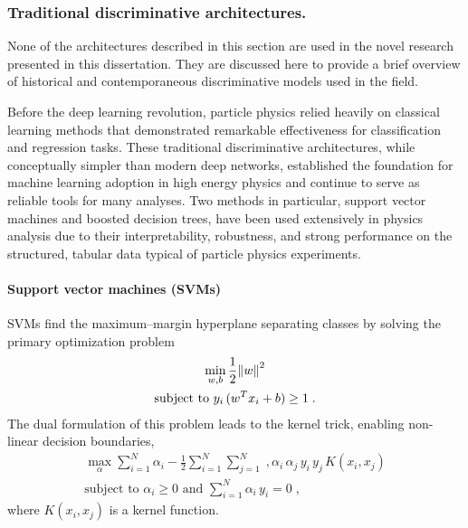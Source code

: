         \subsubsection{Traditional discriminative architectures.}
                \begin{note*}
                    None of the architectures described in this section are used in the novel research presented in this dissertation.
                    They are discussed here to provide a brief overview of historical and contemporaneous discriminative models used in the field.
                \end{note*}
            Before the deep learning revolution, particle physics relied heavily on classical learning methods that demonstrated remarkable effectiveness for classification and regression tasks.
            These traditional discriminative architectures, while conceptually simpler than modern deep networks, established the foundation for machine learning adoption in high energy physics and continue to serve as reliable tools for many analyses.
            Two methods in particular, support vector machines and boosted decision trees, have been used extensively in physics analysis due to their interpretability, robustness, and strong performance on the structured, tabular data typical of particle physics experiments.
        \paragraph{Support vector machines (SVMs)}
            SVMs find the maximum--margin hyperplane separating classes by solving the primary optimization problem
            \begin{gather}
                \min_{w,b} \frac{1}{2}\norm{w}^2 \\ \text{subject to } y_i\,(w^T x_i + b) \geq 1\;.
            \end{gather}
            The dual formulation of this problem leads to the kernel trick, enabling non-linear decision boundaries,
            \begin{gather}
                \max_{\alpha} \sum_{i=1}^N \alpha_i - \frac{1}{2}\sum_{i=1}^N\sum_{j=1}^N \;,\alpha_i\,\alpha_j \,y_i\, y_j \,K(x_i,x_j)\\\text{subject to }\alpha_i\ge0 \text{ and } \sum_{i=1}^N \alpha_i \, y_i = 0\;,
            \end{gather}
            where \(K(x_i,x_j)\) is a kernel function.
        
